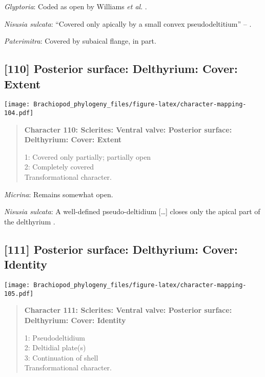 \documentclass[openany]{book}
\theoremstyle{definition}
\theoremstyle{definition}
\theoremstyle{definition}
\theoremstyle{remark}
\begin{document}
\hypertarget{Glyptoria-coding-109}{}
\emph{Glyptoria}: Coded as open by Williams \emph{et al}.
\citeyearpar{Williams1998Thediversity}.

\hypertarget{Nisusia_sulcata-coding-109}{}
\emph{Nisusia sulcata}: ``Covered only apically by a small convex
pseudodeltitium'' -- \citet{Holmer2018Evolutionarysignificance}.

\hypertarget{Paterimitra-coding-109}{}
\emph{Paterimitra}: Covered by subaical flange, in part.

\subsection*{{[}110{]} Posterior surface: Delthyrium: Cover:
Extent}\label{posterior-surface-delthyrium-cover-extent}

\texttt{[image: Brachiopod\_phylogeny\_files/figure-latex/character-mapping-104.pdf]}

\begin{quote}
\textbf{Character 110: Sclerites: Ventral valve: Posterior surface:
Delthyrium: Cover: Extent}

1: Covered only partially; partially open\\
2: Completely covered\\
Transformational character.
\end{quote}

\hypertarget{Micrina-coding-110}{}
\emph{Micrina}: Remains somewhat open.

\hypertarget{Nisusia_sulcata-coding-110}{}
\emph{Nisusia sulcata}: A well-defined pseudo-deltidium {[}\ldots{}{]}
closes only the apical part of\\
the delthyrium \citep{Rowell1985Theevolutionary}.

\subsection*{{[}111{]} Posterior surface: Delthyrium: Cover:
Identity}\label{posterior-surface-delthyrium-cover-identity}

\texttt{[image: Brachiopod\_phylogeny\_files/figure-latex/character-mapping-105.pdf]}

\begin{quote}
\textbf{Character 111: Sclerites: Ventral valve: Posterior surface:
Delthyrium: Cover: Identity}

1: Pseudodeltidium\\
2: Deltidial plate(s)\\
3: Continuation of shell\\
Transformational character.
\end{quote}
\end{document}
